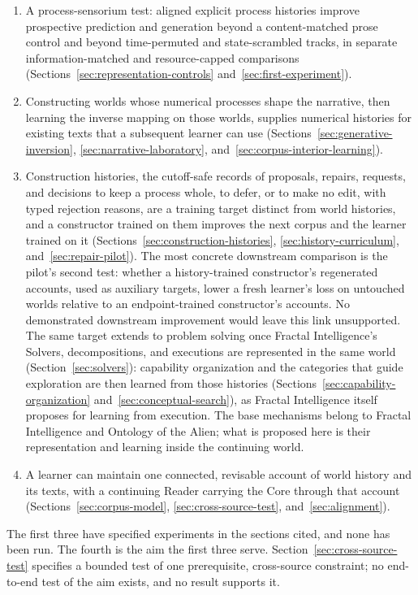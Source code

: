 \documentclass[10pt]{article}
\begin{document}
\begin{enumerate}[nosep]
\item A process-sensorium test: aligned explicit process histories
  improve prospective prediction and generation beyond a content-matched prose control and beyond time-permuted
  and state-scrambled tracks, in separate information-matched and
  resource-capped comparisons
  (Sections~\ref{sec:representation-controls} and~\ref{sec:first-experiment}).
\item Constructing worlds whose numerical processes shape the narrative, then
  learning the inverse mapping on those worlds, supplies numerical histories
  for existing texts that a subsequent learner can use
  (Sections~\ref{sec:generative-inversion}, \ref{sec:narrative-laboratory},
  and~\ref{sec:corpus-interior-learning}).
\item Construction histories, the cutoff-safe records of proposals, repairs,
  requests, and decisions to keep a process whole, to defer, or to make no
  edit, with typed rejection reasons, are a training
  target distinct from world histories, and a constructor trained on them
  improves the next corpus and the learner trained on it
  (Sections~\ref{sec:construction-histories}, \ref{sec:history-curriculum},
  and~\ref{sec:repair-pilot}). The most concrete downstream comparison is the
  pilot's second test: whether a history-trained constructor's regenerated
  accounts, used as auxiliary targets, lower a fresh learner's loss on
  untouched worlds relative to an endpoint-trained constructor's accounts. No
  demonstrated downstream improvement would leave this link unsupported. The
  same target extends to problem solving once Fractal Intelligence's Solvers,
  decompositions, and executions are represented in the same world
  (Section~\ref{sec:solvers}): capability organization and the categories that
  guide exploration are then learned from those histories
  (Sections~\ref{sec:capability-organization} and~\ref{sec:conceptual-search}),
  as Fractal Intelligence itself proposes for learning from execution. The base
  mechanisms belong to Fractal Intelligence and Ontology of the Alien; what is
  proposed here is their representation and learning inside the continuing
  world.
\item A learner can maintain one connected, revisable account of world history
  and its texts, with a continuing Reader carrying the Core through that
  account (Sections~\ref{sec:corpus-model}, \ref{sec:cross-source-test},
  and~\ref{sec:alignment}).
\end{enumerate}
The first three have specified experiments in the sections cited, and none has
been run. The fourth is the aim the first three serve.
Section~\ref{sec:cross-source-test} specifies a bounded test of one
prerequisite, cross-source constraint; no end-to-end test of the aim exists,
and no result supports it.
\end{document}
